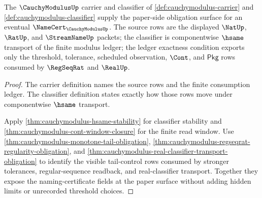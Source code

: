\begin{theorem}
\label{thm:cauchymodulus-namecert-obligation-surface}
The $\CauchyModulusUp$ carrier and classifier of
\autoref{def:cauchymodulus-carrier} and
\autoref{def:cauchymodulus-classifier} supply the paper-side obligation
surface for an eventual $\NameCert_{\CauchyModulusUp}$. The source rows are the
displayed $\NatUp$, $\RatUp$, and $\StreamNameUp$ packets; the classifier is
componentwise $\hsame$ transport of the finite modulus ledger; the ledger
exactness condition exports only the threshold, tolerance, scheduled
observation, $\Cont$, and $\mathsf{Pkg}$ rows consumed by $\RegSeqRat$ and
$\RealUp$.
\end{theorem}
\begin{proof}
The carrier definition names the source rows and the finite consumption ledger.
The classifier definition states exactly how those rows move under
componentwise $\hsame$ transport.

Apply \autoref{thm:cauchymodulus-hsame-stability} for classifier stability and
\autoref{thm:cauchymodulus-cont-window-closure} for the finite read window.
Use \autoref{thm:cauchymodulus-monotone-tail-obligation},
\autoref{thm:cauchymodulus-regseqrat-regularity-obligation}, and
\autoref{thm:cauchymodulus-real-classifier-transport-obligation} to identify
the visible tail-control rows consumed by stronger tolerances,
regular-sequence readback, and real-classifier transport. Together they expose
the naming-certificate fields at the paper surface without adding hidden
limits or unrecorded threshold choices.
\end{proof}

